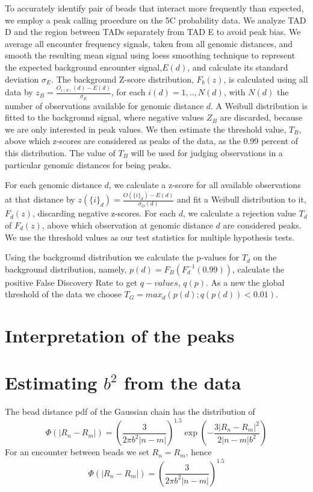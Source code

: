 \documentclass[12pt]{book}
\begin{document}
To accurately identify pair of beads that interact more frequently than expected, we employ a peak calling procedure on the 5C probability data. We analyze TAD D and the region between TADs separately from TAD E to avoid peak bias. We average all encounter frequency signals, taken from all genomic distances, and smooth the resulting mean signal using loess smoothing technique to represent the expected background encounter signal,$E(d)$, and calculate its standard deviation $\sigma_E$. The background Z-score distribution, $F_b(z)$, is calculated using all data by $z_B=\frac{O_{i(d)}(d)-E(d)}{\sigma_E}$, for each $i(d)=1,..,N(d)$, with $N(d)$ the number of observations available for genomic distance $d$. A Weibull distribution is fitted to the background signal, where negative values $Z_B$ are discarded, because we are only interested in peak values. We then estimate the threshold value, $T_B$, above which z-scores are considered as peaks of the data, as the 0.99 percent of this distribution. The value of $T_B$ will be used for judging observations in a particular genomic distances for being peaks.

For each genomic distance $d$, we calculate a z-score for all available observations at that distance by $z({\{i\}_d})=\frac{O({\{i\}_d})-E(d)}{\sigma_{O}(d)}$ and fit a Weibull distribution to it, $F_d(z)$, discarding negative z-scores. For each $d$, we calculate a rejection value $T_d$ of $F_d(z)$, above which observation at genomic distance $d$ are considered peaks. We use the threshold values as our test statistics for multiple hypothesis tests.

Using the background distribution we calculate the p-values for $T_d$ on the background distribution, namely, $p(d)=F_B(F_d^{-1}(0.99))$, calculate the positive False Discovery Rate\cite{storey2002direct} to get $q-values$, $q(p)$. As a new the global threshold of the data we choose $T_G = max_d (p(d); q(p(d))<0.01)$.

\section{Interpretation of the peaks}\label{section_interpretationOfThePeaks}

\section{Estimating $b^2$ from the data}\label{section_estimatingb2}
The bead distance pdf of the Gaussian chain has the distribution of 
\begin{equation*}
\Phi(|R_n-R_m|)=\left(\frac{3}{2\pi b^2 |n-m|}\right)^{1.5}\exp(-\frac{3|R_n-R_m|^2}{2|n-m|b^2})
\end{equation*} 
For an encounter between beads we set $R_n=R_m$, hence 
\begin{equation*}
\Phi(|R_n-R_m|)=\left(\frac{3}{2\pi b^2 |n-m|}\right)^{1.5}
\end{equation*}
\end{document}
